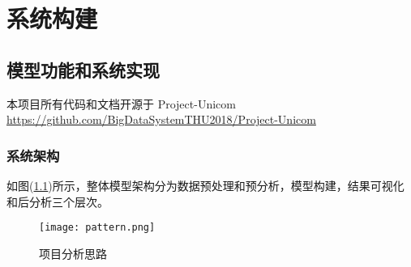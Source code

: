 
\chapter{系统构建} %
\label{AppendixB} %
\section{模型功能和系统实现}

本项目所有代码和文档开源于 Project-Unicom \quad \url{https://github.com/BigDataSystemTHU2018/Project-Unicom}

\subsection{系统架构}
如图(\ref{fig:pattern})所示，整体模型架构分为数据预处理和预分析，模型构建，结果可视化和后分析三个层次。
\begin{figure}[ht]
\centering
\texttt{[image: pattern.png]}
\caption{项目分析思路}
\label{fig:pattern}
\end{figure}
